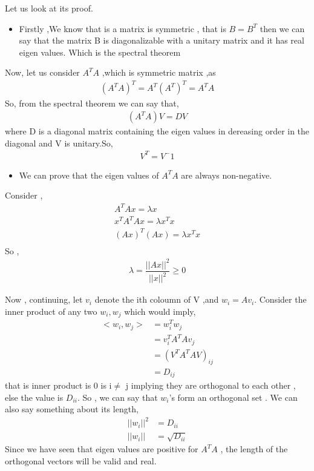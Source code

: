 \documentclass[12pt,a4paper]{article}
\begin{document}
{Let us look at its proof. 
\begin{itemize}
    \item Firstly ,We know that is a matrix is symmetric , that is $B = B^T$ then we can say that the matrix B is diagonalizable with a unitary matrix and it has real eigen values. Which is the spectral theorem
\end{itemize}

Now, let us consider $A^TA$ ,which is symmetric matrix ,as
\begin{align*}
    (A^TA)^T = A^T(A^T)^T = A^TA
\end{align*}
So, from the spectral theorem we can say that,
\begin{align*}
    (A^TA)V = DV 
\end{align*}
where D is a diagonal matrix containing the eigen values in dereasing order in the diagonal and V is unitary.So,
\begin{align*}
    V^T = V^-1
\end{align*}

\begin{itemize}
    \item We can prove that the eigen values of $A^TA$ are always non-negative.
\end{itemize}

Consider ,
\begin{align*}
    A^TA x = \lambda x \\
    x^T A^TA x = \lambda x^T x \\
    (Ax)^T(Ax) = \lambda x^T x\\
\end{align*}
So , 
\begin{align*}
    \lambda = \dfrac{||Ax||^2}{||x||^2} \ge 0
\end{align*}

Now , continuing,
let $v_i$ denote the ith coloumn of V ,and $w_i = Av_i$.
Consider the inner product of any two $w_i,w_j$ which would imply,
\begin{align*}
    <w_i , w_j> &= w^T_i w_j \\
                &= v^T_i A^T Av_j \\
                &= (V^TA^TAV)_{ij} \\
                &= D_{ij} 
\end{align*}
that is inner product is 0 is i$\neq$ j implying they are orthogonal to each other , else the value is $D_{ii}$.
So , we can say that $w_i$'s form an orthogonal set .
We can also say something about its length,
\begin{align*}
    ||w_i||^2 &= D_{ii} \\
    ||w_i|| &= \sqrt{D_{ii}}
\end{align*}
Since we have seen that eigen values are positive for $A^T A$ , the length of the orthogonal vectors will be valid and real.

}
\end{document}

